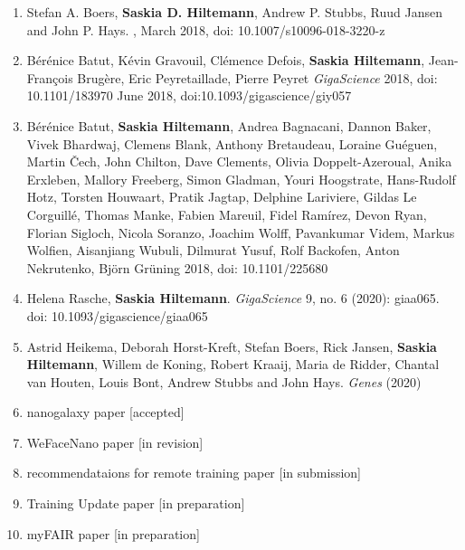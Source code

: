 \begin{enumerate}
\item Stefan A. Boers, \textbf{Saskia D. Hiltemann}, Andrew P. Stubbs, Ruud Jansen and John P. Hays. {\color{chaptergrey}{Development and evaluation of a culture-free microbiota profiling platform (MYcrobiota) for clinical diagnostics}}, March 2018, doi: 10.1007/s10096-018-3220-z

\item Bérénice Batut, Kévin Gravouil, Clémence Defois, \textbf{Saskia Hiltemann}, Jean-François Brugère, Eric Peyretaillade, Pierre Peyret {\color{chaptergrey}{ASaiM: a Galaxy-based framework to analyze raw shotgun data from microbiota.}} \textit{GigaScience} 2018, doi: 10.1101/183970
June 2018, doi:10.1093/gigascience/giy057


\item Bérénice Batut, \textbf{Saskia Hiltemann}, Andrea Bagnacani, Dannon Baker, Vivek Bhardwaj, Clemens Blank, Anthony Bretaudeau, Loraine Guéguen, Martin Čech, John Chilton, Dave Clements, Olivia Doppelt-Azeroual, Anika Erxleben, Mallory Freeberg, Simon Gladman, Youri Hoogstrate, Hans-Rudolf Hotz, Torsten Houwaart, Pratik Jagtap, Delphine Lariviere, Gildas Le Corguillé, Thomas Manke, Fabien Mareuil, Fidel Ramírez, Devon Ryan, Florian Sigloch, Nicola Soranzo, Joachim Wolff, Pavankumar Videm, Markus Wolfien, Aisanjiang Wubuli, Dilmurat Yusuf, Rolf Backofen, Anton Nekrutenko, Björn Grüning {\color{chaptergrey}{Community-driven data analysis training for biology.}} 2018, doi: 10.1101/225680

\item Helena Rasche, \textbf{Saskia Hiltemann}. {\color{chaptergrey}{Galactic Circos: User-friendly Circos plots within the Galaxy platform.}} \textit{GigaScience} 9, no. 6 (2020): giaa065. doi: 10.1093/gigascience/giaa065


\item Astrid Heikema, Deborah Horst-Kreft, Stefan Boers, Rick Jansen, \textbf{Saskia Hiltemann}, Willem de Koning, Robert Kraaij, Maria de Ridder, Chantal van Houten, Louis Bont, Andrew  Stubbs and John Hays. {\color{chaptergrey}{Comparison of Illumina versus Nanopore 16S rRNAGene Sequencing of the Human Nasal Microbiota}} \textit{Genes} (2020)

\item nanogalaxy paper [accepted]
\item WeFaceNano paper [in revision]
\item recommendataions for remote training paper [in submission]
\item Training Update paper [in preparation]
\item myFAIR paper [in preparation]


\end{enumerate}
